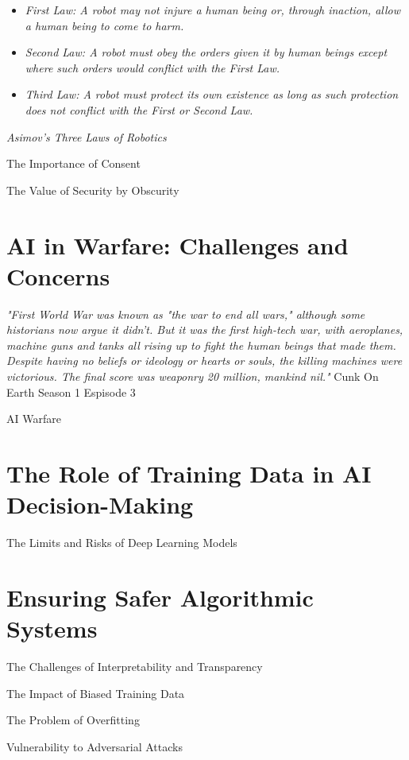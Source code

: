 \begin{itemize}
    \item\textit{First Law: A robot may not injure a human being or, through inaction, allow a human being to come to harm.}
    \item\textit{Second Law: A robot must obey the orders given it by human beings except where such orders would conflict with the First Law.}
    \item\textit{Third Law: A robot must protect its own existence as long as such protection does not conflict with the First or Second Law.}
\end{itemize} 
\textit{Asimov's Three Laws of Robotics}

The Importance of Consent

The Value of Security by Obscurity

\section{AI in Warfare: Challenges and Concerns}

\textit{"First World War was known as "the war to end all wars," although some historians now argue it didn't. But it was the first high-tech war, with aeroplanes, machine guns and tanks all rising up to fight the human beings that made them. Despite having no beliefs or ideology or hearts or souls, the killing machines were victorious. The final score was weaponry 20 million, mankind nil."} Cunk On Earth Season 1 Espisode 3 \cite{cunkonearth}

AI Warfare \cite{aiwarfare}

\section{The Role of Training Data in AI Decision-Making}

The Limits and Risks of Deep Learning Models

\section{Ensuring Safer Algorithmic Systems}

\cite{saferalgorithmicsystems}

The Challenges of Interpretability and Transparency

The Impact of Biased Training Data

The Problem of Overfitting

Vulnerability to Adversarial Attacks


